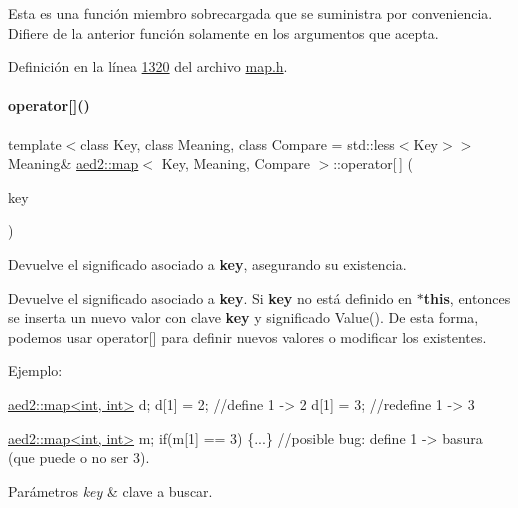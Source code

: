 Esta es una función miembro sobrecargada que se suministra por conveniencia. Difiere de la anterior función solamente en los argumentos que acepta. 

Definición en la línea \hyperlink{map_8h_source_l01320}{1320} del archivo \hyperlink{map_8h_source}{map.\+h}.

\mbox{\label{classaed2_1_1map_a96f23896164ab47bee48c26b803f9801_a96f23896164ab47bee48c26b803f9801}} 
\paragraph{\texorpdfstring{operator[]()}{operator[]()}}
{\footnotesize\ttfamily template$<$class Key, class Meaning, class Compare = std\+::less$<$\+Key$>$$>$ \\
Meaning\& \hyperlink{classaed2_1_1map}{aed2\+::map}$<$ Key, Meaning, Compare $>$\+::operator\mbox{[}$\,$\mbox{]} (\begin{DoxyParamCaption}\item[{const Key \&}]{key }\end{DoxyParamCaption})\hspace{0.3cm}{\ttfamily [inline]}}



Devuelve el significado asociado a {\bfseries key}, asegurando su existencia. 

Devuelve el significado asociado a {\bfseries key}. Si {\bfseries key} no está definido en {\bfseries $\ast$this}, entonces se inserta un nuevo valor con clave {\bfseries key} y significado Value(). De esta forma, podemos usar {\ttfamily operator\mbox{[}\mbox{]}} para definir nuevos valores o modificar los existentes.

Ejemplo\+: 
\begin{DoxyCode}
\hyperlink{classaed2_1_1map}{aed2::map<int, int>} d;
d[1] = 2;      \textcolor{comment}{//define 1 -> 2}
d[1] = 3;      \textcolor{comment}{//redefine 1 -> 3}

\hyperlink{classaed2_1_1map}{aed2::map<int, int>} m;
\textcolor{keywordflow}{if}(m[1] == 3) \{...\} \textcolor{comment}{//posible bug: define 1 -> basura (que puede o no ser}
3).
\end{DoxyCode}



\begin{DoxyParams}{Parámetros}
{\em key} & clave a buscar. \\
\hline
\end{DoxyParams}


